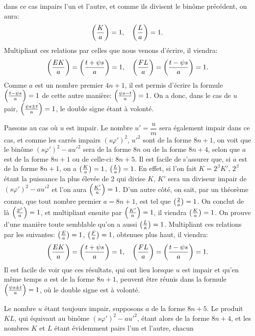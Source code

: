 \noindent
dans ce cas impairs l'un et l'autre, et comme ils divisent le binôme précédent,
on aura:
\[
\left(\frac{K}{a}\right)=1,\quad\left(\frac{L}{a}\right)=1.
\]
Multipliant ces relations par celles que nous venons d'écrire, il viendra:
\[
\left(\frac{EK}{a}\right)=\left(\frac{t+\psi s}{a}\right)=1,\quad\left(\frac{FL}{a}\right)=\left(\frac{t-\psi s}{a}\right)=1.
\]
Comme $a$ est un nombre premier $4n+1$, il est permis d'écrire la formule
$\left(\frac{t-\psi s}{a}\right)=1$ de cette autre manière: $\left(\frac{\psi s-t}{a}\right)=1$. On a donc, dans le cas
de $u$ pair, $\left(\frac{\psi s\pm t}{a}\right)=1$, le double signe étant à volonté.
\par\indent
Passons au cas où $u$ est impair. Le nombre $u'=\dfrac{u}{m}$ sera également
impair dans ce cas, et comme les carrés impairs $(s\varphi')^2$, $u'^2$ sont de la forme
$8n+1$, on voit que le binôme $(s\varphi')^2-au'^2$ sera de la forme $8n$ ou de la forme
$8n+4$, selon que $a$ est de la forme $8n+1$ ou de celle-ci: $8n+5$. Il est facile
de s'assurer que, si $a$ est de la forme $8n+1$, on a $\left(\frac{K}{a}\right)=1$, $\left(\frac{L}{a}\right)=1$.
En effet, si l'on fait $K=2^\beta K'$, $2^\beta$ étant la puissance la plus élevée de 2 qui
divise $K$, $K'$ sera un diviseur impair de $(s\varphi')^2-au'^2$ et l'on aura $\left(\frac{K'}{a}\right)=1$.
D'un autre côté, on sait, par un théorème connu, que tout nombre premier
$a=8n+1$, est tel que $\left(\frac{2}{a}\right)=1$. On conclut de là $\left(\frac{2^\beta}{a}\right)=1$, et multipliant
ensuite par $\left(\frac{K'}{a}\right)=1$, il viendra $\left(\frac{K}{a}\right)=1$. On prouve d'une manière toute
semblable qu'on a aussi $\left(\frac{L}{a}\right)=1$. Multipliant ces relations par les suivantes:
$\left(\frac{E}{a}\right)=1$, $\left(\frac{F}{a}\right)=1$, obtenues plus haut, il viendra:
\[
\left(\frac{EK}{a}\right)=\left(\frac{t+\psi s}{a}\right)=1,\quad\left(\frac{FL}{a}\right)=\left(\frac{t-\psi s}{a}\right)=1.
\]
Il est facile de voir que ces résultats, qui ont lieu lorsque $u$ est impair et
qu'en même temps $a$ est de la forme $8n+1$, peuvent être réunis dans la formule
$\left(\frac{\psi s\pm t}{a}\right)=1$, où le double signe est à volonté.
\par\indent
Le nombre $u$ étant toujours impair, supposons $a$ de la forme $8n+5$.
Le produit $KL$, qui équivaut au binôme $(s\varphi')^2-au'^2$, étant alors de la forme
$8n+4$, et les nombres $K$ et $L$ étant évidemment pairs l'un et l'autre, chacun

